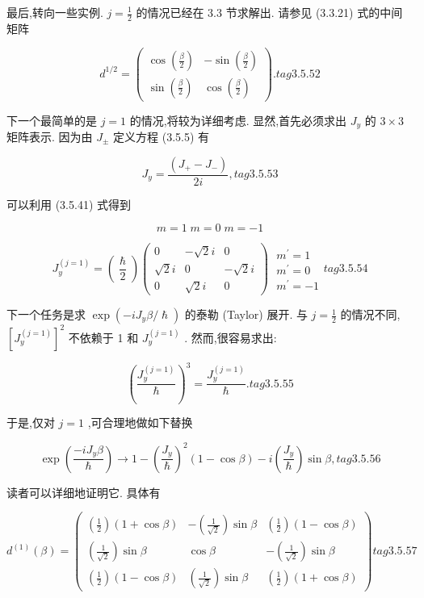 最后,转向一些实例. $j = \frac{1}{2}$ 的情况已经在 3.3 节求解出. 请参见 (3.3.21) 式的中间矩阵

$$
{d}^{1/2} = \left( \begin{matrix} \cos \left( \frac{\beta }{2}\right) & - \sin \left( \frac{\beta }{2}\right) \\ \sin \left( \frac{\beta }{2}\right) & \cos \left( \frac{\beta }{2}\right) \end{matrix}\right) . tag{3. 5.52}
$$

下一个最简单的是 $j = 1$ 的情况,将较为详细考虑. 显然,首先必须求出 ${J}_{y}$ 的 $3 \times 3$ 矩阵表示. 因为由 ${J}_{ \pm }$ 定义方程 (3.5.5) 有

$$
{J}_{y} = \frac{\left( {J}_{ + } - {J}_{ - }\right) }{2i}, tag{3. 5.53}
$$

可以利用 (3.5.41) 式得到

$$
m = 1\;m = 0\;m = - 1
$$

$$
{J}_{y}^{\left( j = 1\right) } = \left( \frac{\hslash }{2}\right) \left( \begin{matrix} 0 & - \sqrt{2}i & 0 \\ \sqrt{2}i & 0 & - \sqrt{2}i \\ 0 & \sqrt{2}i & 0 \end{matrix}\right) \;\begin{array}{l} {m}^{\prime } = 1 \\ {m}^{\prime } = 0 \\ {m}^{\prime } = - 1 \end{array} tag{3. 5.54}
$$

下一个任务是求 $\exp \left( {-i{J}_{y}\beta /\hslash }\right)$ 的泰勒 (Taylor) 展开. 与 $j = \frac{1}{2}$ 的情况不同, ${\left\lbrack {J}_{y}^{\left( j = 1\right) }\right\rbrack }^{2}$ 不依赖于 1 和 ${J}_{y}^{\left( j = 1\right) }$ . 然而,很容易求出:

$$
{\left( \frac{{J}_{y}^{\left( j = 1\right) }}{\hslash }\right) }^{3} = \frac{{J}_{y}^{\left( j = 1\right) }}{\hslash }. tag{3. 5.55}
$$

于是,仅对 $j = 1$ ,可合理地做如下替换

$$
\exp \left( \frac{-i{J}_{y}\beta }{\hslash }\right) \rightarrow 1 - {\left( \frac{{J}_{y}}{\hslash }\right) }^{2}\left( {1 - \cos \beta }\right) - i\left( \frac{{J}_{y}}{\hslash }\right) \sin \beta , tag{3. 5.56}
$$

读者可以详细地证明它. 具体有

$$
{d}^{\left( 1\right) }\left( \beta \right) = \left( \begin{matrix} \left( \frac{1}{2}\right) \left( {1 + \cos \beta }\right) & - \left( \frac{1}{\sqrt{2}}\right) \sin \beta & \left( \frac{1}{2}\right) \left( {1 - \cos \beta }\right) \\ \left( \frac{1}{\sqrt{2}}\right) \sin \beta & \cos \beta & - \left( \frac{1}{\sqrt{2}}\right) \sin \beta \\ \left( \frac{1}{2}\right) \left( {1 - \cos \beta }\right) & \left( \frac{1}{\sqrt{2}}\right) \sin \beta & \left( \frac{1}{2}\right) \left( {1 + \cos \beta }\right) \end{matrix}\right) tag{3. 5.57}
$$

